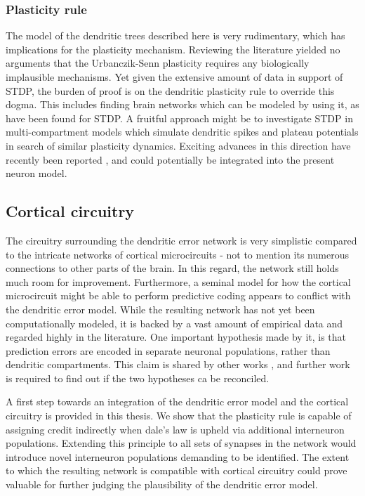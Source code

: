\subsubsection*{Plasticity rule}

The model of the dendritic trees described here is very rudimentary, which has implications for the plasticity
mechanism. Reviewing the literature yielded no arguments that the Urbanczik-Senn plasticity requires any biologically
implausible mechanisms. Yet given the extensive amount of data in support of STDP, the burden of proof is on the
dendritic plasticity rule to override this dogma. This includes finding brain networks which can be modeled by using it,
as have been found for STDP. A fruitful approach might be to investigate STDP in multi-compartment models which simulate
dendritic spikes and plateau potentials in search of similar plasticity dynamics. Exciting advances in this direction
have recently been reported \citep{Bono2017,Schiess2016,magee2020synaptic}, and could potentially be integrated into
the present neuron model.

\subsection*{Cortical circuitry}

The circuitry surrounding the dendritic error network is very simplistic compared to the intricate networks of cortical
microcircuits - not to mention its numerous connections to other parts of the brain. In this regard, the network still
holds much room for improvement. Furthermore, a seminal model for how the cortical microcircuit might be able to perform
predictive coding \citep{bastos2012canonical} appears to conflict with the dendritic error model. While the resulting
network has not yet been computationally modeled, it is backed by a vast amount of empirical data and regarded highly in
the literature. One important hypothesis made by it, is that prediction errors are encoded in separate neuronal
populations, rather than dendritic compartments. This claim is shared by other works
\citep{Hertaeg2022,Whittington2017}, and further work is required to find out if the two hypotheses ca be reconciled.

A first step towards an integration of the dendritic error model and the cortical circuitry is provided in this thesis.
We show that the plasticity rule is capable of assigning credit indirectly when dale's law is upheld via
additional interneuron populations. Extending this principle to all sets of synapses in the network would introduce
novel interneuron populations demanding to be identified. The extent to which the resulting network is compatible with
cortical circuitry could prove valuable for further judging the plausibility of the dendritic error model.

